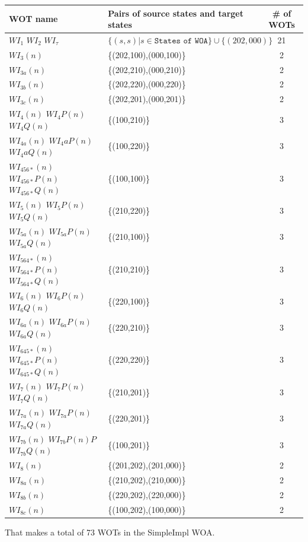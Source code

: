 \documentclass{lmcs}
\begin{document}
\begin{tabular}{|l|l|c|}
\hline
    WOT name & Pairs of source states and target states & \# of WOTs \\
    \hline
    $WI_1$ $WI_2$ $WI_\tau$ & $\{(s,s)| s \in \texttt{States of WOA}\} \cup \{(202,000)\} $ & 21 \\
    $WI_3(n)$ & \{(202,100),(000,100)\} & 2 \\
    $WI_{3a}(n)$ & \{(202,210),(000,210)\} & 2 \\
    $WI_{3b}(n)$ & \{(202,220),(000,220)\} & 2 \\
    $WI_{3c}(n)$ & \{(202,201),(000,201)\} & 2 \\
    $WI_4(n)$ $WI_4P(n)$ $WI_4Q(n)$ & \{(100,210)\} & 3 \\
    $WI_{4a}(n)$ $WI_4aP(n)$ $WI_4aQ(n)$ & \{(100,220)\} & 3 \\
    $WI_{456*}(n) $ $WI_{456*}P(n) $ $WI_{456*}Q(n) $ & \{(100,100)\} & 3 \\
    $WI_5(n)$ $WI_5P(n)$ $WI_5Q(n)$ & \{(210,220)\} & 3 \\
    $WI_{5a}(n)$ $WI_{5a}P(n)$ $WI_{5a}Q(n)$ & \{(210,100)\} & 3 \\
    $WI_{564*}(n) $ $WI_{564*}P(n) $ $WI_{564*}Q(n) $ & \{(210,210)\} & 3 \\
    $WI_6(n)$ $WI_6P(n)$ $WI_6Q(n)$ & \{(220,100)\} & 3 \\
    $WI_{6a}(n)$ $WI_{6a}P(n)$ $WI_{6a}Q(n)$ & \{(220,210)\} & 3 \\
    $WI_{645*}(n) $ $WI_{645*}P(n) $ $WI_{645*}Q(n) $ & \{(220,220)\} & 3 \\
    $WI_7(n)$ $WI_7P(n)$ $WI_7Q(n)$ & \{(210,201)\} & 3 \\
    $WI_{7a}(n)$ $WI_{7a}P(n)$ $WI_{7a}Q(n)$ & \{(220,201)\} & 3 \\
    $WI_{7b}(n)$ $WI_{7b}P(n)P$ $WI_{7b}Q(n)$ & \{(100,201)\} & 3 \\
    $WI_8(n)$ & \{(201,202),(201,000)\} & 2\\ 
    $WI_{8a}(n)$ & \{(210,202),(210,000)\} & 2 \\
    $WI_{8b}(n)$ & \{(220,202),(220,000)\} & 2 \\
    $WI_{8c}(n)$ & \{(100,202),(100,000)\} & 2 \\
   
    \hline
    \end{tabular}

    \bigskip
    That makes a total of 73 WOTs  in the SimpleImpl WOA.
\end{document}
